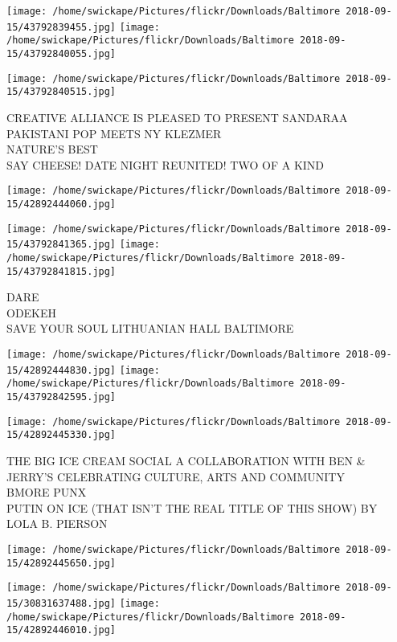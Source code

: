 \documentclass[10pt,letterpaper]{article}
\begin{document}
\texttt{[image: /home/swickape/Pictures/flickr/Downloads/Baltimore 2018-09-15/43792839455.jpg]}
\texttt{[image: /home/swickape/Pictures/flickr/Downloads/Baltimore 2018-09-15/43792840055.jpg]}

\texttt{[image: /home/swickape/Pictures/flickr/Downloads/Baltimore 2018-09-15/43792840515.jpg]}

CREATIVE ALLIANCE IS PLEASED TO PRESENT SANDARAA PAKISTANI POP MEETS NY KLEZMER\\
NATURE'S BEST\\
SAY CHEESE!  DATE NIGHT  REUNITED!  TWO OF A KIND\\
\pagebreak

\texttt{[image: /home/swickape/Pictures/flickr/Downloads/Baltimore 2018-09-15/42892444060.jpg]}

\vspace{0.25in}
\texttt{[image: /home/swickape/Pictures/flickr/Downloads/Baltimore 2018-09-15/43792841365.jpg]}
\texttt{[image: /home/swickape/Pictures/flickr/Downloads/Baltimore 2018-09-15/43792841815.jpg]}

DARE\\
ODEKEH\\
SAVE YOUR SOUL LITHUANIAN HALL BALTIMORE\\
\pagebreak

\texttt{[image: /home/swickape/Pictures/flickr/Downloads/Baltimore 2018-09-15/42892444830.jpg]}
\texttt{[image: /home/swickape/Pictures/flickr/Downloads/Baltimore 2018-09-15/43792842595.jpg]}

\texttt{[image: /home/swickape/Pictures/flickr/Downloads/Baltimore 2018-09-15/42892445330.jpg]}

THE BIG ICE CREAM SOCIAL A COLLABORATION WITH BEN \& JERRY'S CELEBRATING CULTURE, ARTS AND COMMUNITY\\
BMORE PUNX\\
PUTIN ON ICE (THAT ISN'T THE REAL TITLE OF THIS SHOW) BY LOLA B. PIERSON\\
\pagebreak

\texttt{[image: /home/swickape/Pictures/flickr/Downloads/Baltimore 2018-09-15/42892445650.jpg]}

\vspace{0.25in}
\texttt{[image: /home/swickape/Pictures/flickr/Downloads/Baltimore 2018-09-15/30831637488.jpg]}
\texttt{[image: /home/swickape/Pictures/flickr/Downloads/Baltimore 2018-09-15/42892446010.jpg]}
\end{document}
